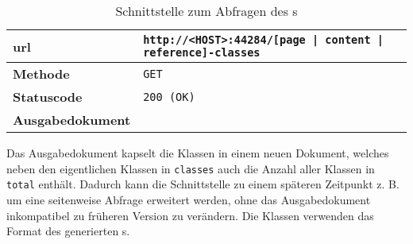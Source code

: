     \begin{table}[htb]
        \centering
        \begin{tabular}{|l|l|}
        \hline
        \textbf{\gls{url}} & \texttt{http://<HOST>:44284/[page | content | reference]-classes}\\
        \hline
        \textbf{Methode} & \texttt{GET}\\
        \hline
        \textbf{Statuscode} & \texttt{200 (OK)}\\
        \hline
        \textbf{Ausgabedokument} & \\
        \hline
        \end{tabular}
        \caption{Schnittstelle zum Abfragen des {\classificationModel}s}
        \label{table:getClassesInterface}
    \end{table}

    Das Ausgabedokument kapselt die Klassen in einem neuen Dokument,
    welches neben den eigentlichen Klassen in \texttt{classes}
    auch die Anzahl aller Klassen in \texttt{total} enthält.
    Dadurch kann die Schnittstelle zu einem späteren Zeitpunkt z. B. um eine
    seitenweise Abfrage erweitert werden,
    ohne das Ausgabedokument inkompatibel zu früheren Version zu verändern.
    Die Klassen verwenden das Format des generierten
    {\classificationModel}s.
